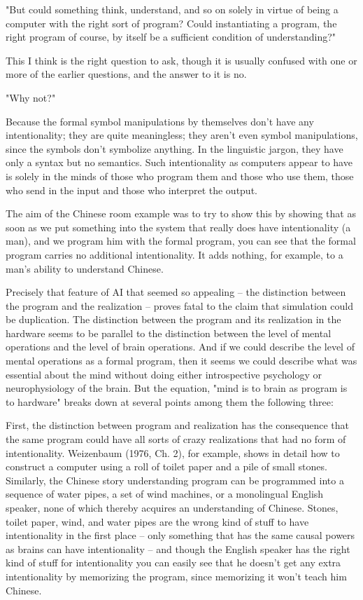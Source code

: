"But could something think, understand, and so on solely in virtue of being a computer with the right sort of
program? Could instantiating a program, the right program of course, by itself be a sufficient condition of
understanding?"

This I think is the right question to ask, though it is usually confused with one or more of the earlier questions,
and the answer to it is no.

"Why not?"

Because the formal symbol manipulations by themselves don't have any intentionality; they are quite
meaningless; they aren't even symbol manipulations, since the symbols don't symbolize anything. In the linguistic
jargon, they have only a syntax but no semantics. Such intentionality as computers appear to have is solely in
the minds of those who program them and those who use them, those who send in the input and those who
interpret the output.

The aim of the Chinese room example was to try to show this by showing that as soon as we put something into the system that really does have intentionality (a man), and we program him with the formal program, you
can see that the formal program carries no additional intentionality. It adds nothing, for example, to a man's
ability to understand Chinese.

Precisely that feature of AI that seemed so appealing -- the distinction between the program and the realization
-- proves fatal to the claim that simulation could be duplication. The distinction between the program and its
realization in the hardware seems to be parallel to the distinction between the level of mental operations and the
level of brain operations. And if we could describe the level of mental operations as a formal program, then it
seems we could describe what was essential about the mind without doing either introspective psychology or
neurophysiology of the brain. But the equation, "mind is to brain as program is to hardware" breaks down at
several points among them the following three:

First, the distinction between program and realization has the consequence that the same program could have
all sorts of crazy realizations that had no form of intentionality. Weizenbaum (1976, Ch. 2), for example, shows
in detail how to construct a computer using a roll of toilet paper and a pile of small stones. Similarly, the Chinese
story understanding program can be programmed into a sequence of water pipes, a set of wind machines, or a
monolingual English speaker, none of which thereby acquires an understanding of Chinese. Stones, toilet paper,
wind, and water pipes are the wrong kind of stuff to have intentionality in the first place -- only something that
has the same causal powers as brains can have intentionality -- and though the English speaker has the right
kind of stuff for intentionality you can easily see that he doesn't get any extra intentionality by memorizing the
program, since memorizing it won't teach him Chinese.

